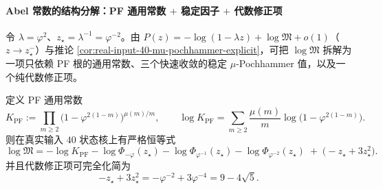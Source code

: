 \paragraph{Abel 常数的结构分解：PF 通用常数 \texorpdfstring{$+$}{+} 稳定因子 \texorpdfstring{$+$}{+} 代数修正项}
令 \(\lambda=\varphi^2\)、\(z_\star=\lambda^{-1}=\varphi^{-2}\)。由 \(P(z)=-\log(1-\lambda z)+\log\mathfrak{M}+o(1)\)（\(z\to z_\star^{-}\)）与推论 \ref{cor:real-input-40-mu-pochhammer-explicit}，可把 \(\log\mathfrak M\) 拆解为一项只依赖 PF 根的通用常数、三个快速收敛的稳定 \(\mu\)-Pochhammer 值，以及一个纯代数修正项。

\begin{corollary}\label{cor:logM-mu-pochhammer-split}
定义 PF 通用常数
\[
K_{\mathrm{PF}}
:=\prod_{m\ge 2}\bigl(1-\varphi^{2(1-m)}\bigr)^{\mu(m)/m},
\qquad
\log K_{\mathrm{PF}}
=\sum_{m\ge 2}\frac{\mu(m)}{m}\log\bigl(1-\varphi^{2(1-m)}\bigr).
\]
则在真实输入 \(40\) 状态核上有严格恒等式
\[
\boxed{
\log\mathfrak{M}
=-\log K_{\mathrm{PF}}
-\log\Phi_{-\varphi}(z_\star)
-\log\Phi_{\varphi^{-1}}(z_\star)
-\log\Phi_{\varphi^{-2}}(z_\star)
\;+\;\bigl(-z_\star+3z_\star^2\bigr).
}
\]
并且代数修正项可完全化简为
\[
-z_\star+3z_\star^2=-\varphi^{-2}+3\varphi^{-4}=9-4\sqrt5.
\]
\end{corollary}

